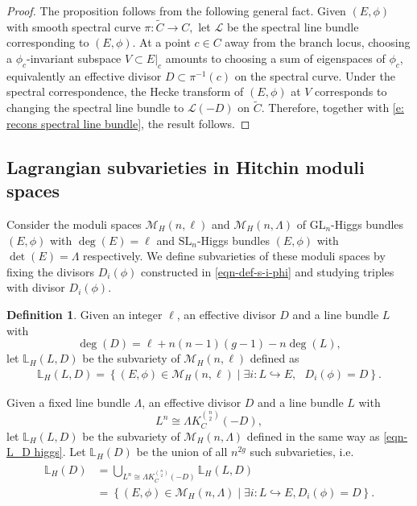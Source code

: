 \documentclass[twoside, 11pt]{article}
\numberwithin{equation}{section}
\theoremstyle{theorem}
\numberwithin{theorem}{section}
\theoremstyle{definition}
\newtheorem{definition}[definition]{Definition}
\begin{document}
\begin{proof}
    The proposition follows from the following general fact. Given \((E,\phi)\) with smooth spectral curve
\(
\pi:\widetilde C\to C,
\)
let \(\mathcal L\) be the spectral line bundle corresponding to \((E,\phi)\). At a point \(c\in C\) away from the branch locus, choosing a \(\phi_c\)-invariant subspace
\(
V\subset E|_c
\)
amounts to choosing a sum of eigenspaces of \(\phi_c\), equivalently an effective divisor
\(
D\subset \pi^{-1}(c)
\)
on the spectral curve. Under the spectral correspondence, the Hecke transform of \((E,\phi)\) at \(V\) corresponds to changing the spectral line bundle to
\(
\mathcal L(-D)
\)
on \(\widetilde C\). Therefore, together with \eqref{e: recons spectral line bundle}, the result follows.
\end{proof}


\subsection{Lagrangian subvarieties in Hitchin moduli spaces}

Consider the moduli spaces
$\mathcal{M}_{H}(n, \ell)$ and $\mathcal{M}_H(n, \Lambda)$ 
of $\mathrm{GL}_n$-Higgs bundles $(E, \phi)$ with $\deg(E) = \ell$ 
and $\mathrm{SL}_n$-Higgs bundles $(E, \phi)$ with $\det(E) = \Lambda$ respectively.
We define subvarieties of these moduli spaces 
by fixing the divisors $D_i(\phi)$ constructed in \eqref{eqn-def-s-i-phi} and studying triples with divisor $D_i(\phi)$.

\begin{definition}\label{def: Lag in Higgs}
Given an integer $\ell$, an effective divisor $D$ and a line bundle $L$ with
\begin{equation}\label{eqn-GLn-constraint-d}
\deg(D) = \ell + n(n-1)(g-1) - n \deg(L),
\end{equation}
let \(\mathbb{L}_{{H}}(L, D)\) be the subvariety of \(\mathcal{M}_{H}(n, \ell) \) defined as 
\begin{align}\label{eqn-L_D higgs}
    \mathbb{L}_{H}(L, D) = 
\left\{ (E, \phi) \in \mathcal{M}_{H}(n, \ell) 
\mid \exists i: L \hookrightarrow E, \text{ } D_i(\phi) = D\right\}.
\end{align}

Given a fixed line bundle $\Lambda$, 
an effective divisor $D$ and a line bundle $L$ with
\begin{equation}\label{eqn-SLn-constraint-D}
L^n \cong  \Lambda K_C^{n \choose 2}(-D),    
\end{equation}
let \(\mathbb{L}_{H}(L, D)\) be the subvariety
of \(\mathcal{M}_{H}(n, \Lambda) \) defined in the same way as \eqref{eqn-L_D higgs}.
Let $\mathbb{L}_{H}(D)$ be the union of all $n^{2g}$ such subvarieties, i.e.
\begin{align}
\begin{split}
    \mathbb{L}_{H}(D) &= \bigcup_{L^n \cong  \Lambda K_C^{n \choose 2}(-D)} \mathbb{L}_{H}(L, D) \\
    &= 
\left\{ (E, \phi) \in \mathcal{M}_{H}(n, \Lambda) 
\mid \exists i: L \hookrightarrow E, D_i(\phi) = D\right\}.
\end{split}
\end{align}
\end{definition}
\end{document}
